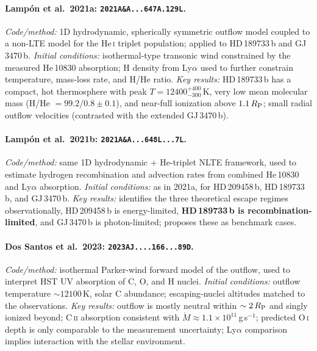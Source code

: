 \paragraph{Lamp\'on et al.\ 2021a: \texttt{2021A\&A...647A.129L}.}
\emph{Code/method:} 1D hydrodynamic, spherically symmetric outflow model
coupled to a non-LTE model for the He\,\textsc{i} triplet population; applied to
HD\,189733\,b and GJ\,3470\,b.
\emph{Initial conditions:} isothermal-type transonic wind constrained by the
measured He\,10830 absorption; H density from Ly$\alpha$ used to further
constrain temperature, mass-loss rate, and H/He ratio.
\emph{Key results:} HD\,189733\,b has a compact, hot thermosphere with peak
$T=12400^{+400}_{-300}$\,K, very low mean molecular mass
(H/He $=99.2/0.8\pm0.1$), and near-full ionization above $1.1\,R_{\rm P}$;
small radial outflow velocities (contrasted with the extended GJ\,3470\,b).

\paragraph{Lamp\'on et al.\ 2021b: \texttt{2021A\&A...648L...7L}.}
\emph{Code/method:} same 1D hydrodynamic + He-triplet NLTE framework, used to
estimate hydrogen recombination and advection rates from combined He\,10830 and
Ly$\alpha$ absorption.
\emph{Initial conditions:} as in 2021a, for HD\,209458\,b, HD\,189733\,b, and
GJ\,3470\,b.
\emph{Key results:} identifies the three theoretical escape regimes
observationally, HD\,209458\,b is energy-limited, \textbf{HD\,189733\,b is
recombination-limited}, and GJ\,3470\,b is photon-limited; proposes these as
benchmark cases.

\paragraph{Dos Santos et al.\ 2023: \texttt{2023AJ....166...89D}.}
\emph{Code/method:} isothermal Parker-wind forward model of the outflow, used to
interpret HST UV absorption of C, O, and H nuclei.
\emph{Initial conditions:} outflow temperature $\sim12100$\,K, solar C
abundance; escaping-nuclei altitudes matched to the observations.
\emph{Key results:} outflow is mostly neutral within $\sim2\,R_{\rm P}$ and
singly ionized beyond; C\,\textsc{ii} absorption consistent with
$\dot{M}\approx1.1\times10^{11}$\,g\,s$^{-1}$; predicted O\,\textsc{i} depth is
only comparable to the measurement uncertainty; Ly$\alpha$ comparison implies
interaction with the stellar environment.

